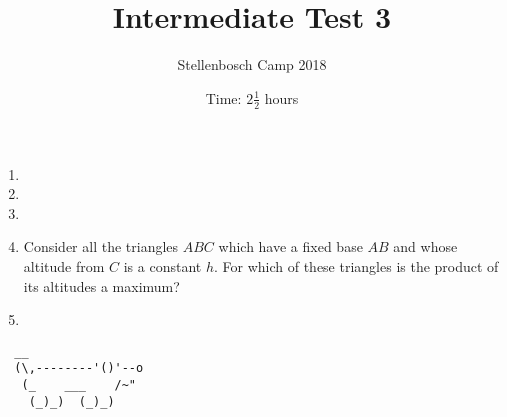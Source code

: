 \documentclass{article}
\title{Intermediate Test 3}
\author{Stellenbosch Camp 2018}
\date{Time: $2\frac{1}{2}$ hours}
\begin{document}
\maketitle

\begin{enumerate}[1.]

\item %


\vspace{12pt}
\item 


\vspace{12pt}
\item %


\vspace{12pt}
\item %
Consider all the triangles $ABC$ which have a fixed base $AB$ and whose altitude from $C$ is a constant $h$. For which of these triangles is the product of its altitudes a maximum? 


\vspace{12pt}
\item %


\end{enumerate}


\vspace{12pt}
\begin{center}
\begin{BVerbatim}
  __
  (\,--------'()'--o
   (_    ___    /~"
    (_)_)  (_)_)
\end{BVerbatim}
\end{center}
\end{document}

